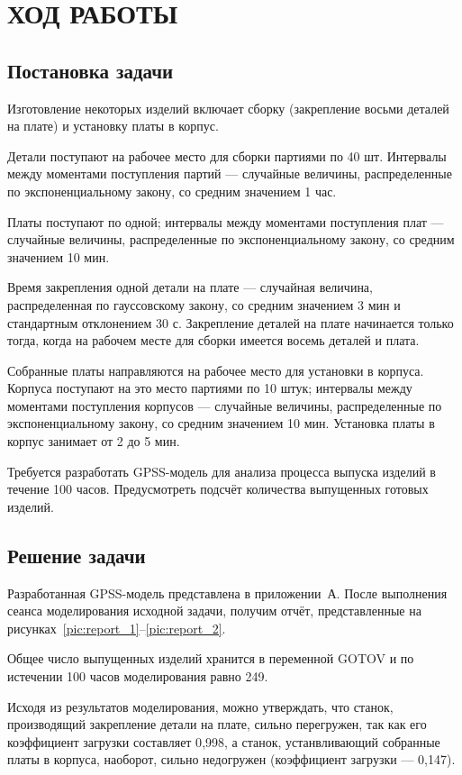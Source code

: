 \section{ХОД РАБОТЫ}

\subsection{Постановка задачи}

Изготовление некоторых изделий включает сборку (закрепление восьми деталей на плате)
и установку платы в корпус.

Детали поступают на рабочее место для сборки партиями по 40 шт.
Интервалы между моментами поступления партий --- случайные величины,
распределенные по экспоненциальному закону, со средним значением 1 час.

Платы поступают по одной; интервалы между моментами поступления плат --- случайные величины,
распределенные по экспоненциальному закону, со средним значением 10 мин.

Время закрепления одной детали на плате --- случайная величина, 
распределенная по гауссовскому закону, со средним значением 3 мин и стандартным отклонением 30 с.
Закрепление деталей на плате начинается только тогда, когда на рабочем месте для сборки
имеется восемь деталей и плата.

Собранные платы направляются на рабочее место для установки в корпуса.
Корпуса поступают на это место партиями по 10 штук; интервалы между моментами поступления корпусов
--- случайные величины, распределенные по экспоненциальному закону, со средним значением 10 мин.
Установка платы в корпус занимает от 2 до 5 мин.

Требуется разработать GPSS-модель для анализа процесса выпуска изделий в течение 100 часов.
Предусмотреть подсчёт количества выпущенных готовых изделий.

\subsection{Решение задачи}

Разработанная GPSS-модель представлена в приложении~А. После выполнения сеанса
моделирования исходной задачи, получим отчёт, представленные на
рисунках~\ref{pic:report_1}--\ref{pic:report_2}.

Общее число выпущенных изделий хранится в переменной GOTOV и 
по истечении 100 часов моделирования равно 249.

Исходя из результатов моделирования, можно утверждать, что 
станок, производящий закрепление детали на плате, сильно перегружен,
так как его коэффициент загрузки составляет 0{,}998, а станок,
устанвливающий собранные платы в корпуса, наоборот, сильно недогружен
(коэффициент загрузки --- 0{,}147). 


